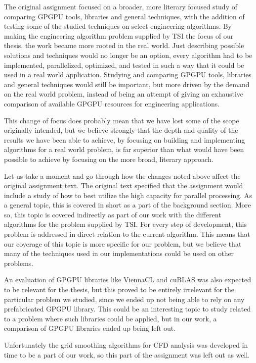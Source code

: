The original assignment focused on a broader, more literary focused study of comparing GPGPU tools, libraries and general techniques, with the addition of testing some of the studied techniques on select engineering algorithms. By making the engineering algorithm problem supplied by TSI the focus of our thesis, the work became more rooted in the real world. Just describing possible solutions and techniques would no longer be an option, every algorithm had to be implemented, parallelized, optimized, and tested in such a way that it could be used in a real world application. Studying and comparing GPGPU tools, libraries and general techniques would still be important, but more driven by the demand on the real world problem, instead of being an attempt of giving an exhaustive comparison of available GPGPU resources for engineering applications.

This change of focus does probably mean that we have lost some of the scope originally intended, but we believe strongly that the depth and quality of the results we have been able to achieve, by focusing on building and implementing algorithms for a real world problem, is far superior than what would have been possible to achieve by focusing on the more broad, literary approach.

Let us take a moment and go through how the changes noted above affect the original assignment text. The original text specified that the assignment would include a study of how to best utilize the high capacity for parallel processing. As a general topic, this is covered in short as a part of the background section. More so, this topic is covered indirectly as part of our work with the different algorithms for the problem supplied by TSI. For every step of development, this problem is addressed in direct relation to the current algorithm. This means that our coverage of this topic is more specific for our problem, but we believe that many of the techniques used in our implementations could be used on other problems.

An evaluation of GPGPU libraries like ViennaCL and cuBLAS was also expected to be relevant for the thesis, but this proved to be entirely irrelevant for the particular problem we studied, since we ended up not being able to rely on any prefabricated GPGPU library. This could be an interesting topic to study related to a problem where such libraries could be applied, but in our work, a comparison of GPGPU libraries ended up being left out.

Unfortunately the grid smoothing algorithms for CFD analysis was developed in time to be a part of our work, so this part of the assignment was left out as well.